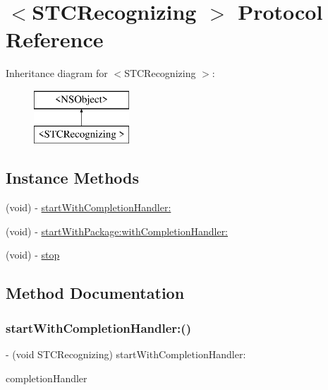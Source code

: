 \hypertarget{protocol_s_t_c_recognizing_01-p}{}\section{$<$S\+T\+C\+Recognizing $>$ Protocol Reference}
\label{protocol_s_t_c_recognizing_01-p}
Inheritance diagram for $<$S\+T\+C\+Recognizing $>$\+:\begin{figure}[H]
\begin{center}
\leavevmode
\includegraphics[height=2.000000cm]{protocol_s_t_c_recognizing_01-p}
\end{center}
\end{figure}
\subsection*{Instance Methods}
\begin{DoxyCompactItemize}
\item 
(void) -\/ \hyperlink{protocol_s_t_c_recognizing_01-p_ae0cec0327a48fd3fe5b712d13028d201}{start\+With\+Completion\+Handler\+:}
\item 
(void) -\/ \hyperlink{protocol_s_t_c_recognizing_01-p_af680d307ec5cb7c13486114a50149b3b}{start\+With\+Package\+:with\+Completion\+Handler\+:}
\item 
(void) -\/ \hyperlink{protocol_s_t_c_recognizing_01-p_a8654bee0d2c8cdea7df905605b7522f8}{stop}
\end{DoxyCompactItemize}


\subsection{Method Documentation}
\hypertarget{protocol_s_t_c_recognizing_01-p_ae0cec0327a48fd3fe5b712d13028d201}{}\label{protocol_s_t_c_recognizing_01-p_ae0cec0327a48fd3fe5b712d13028d201} 
\subsubsection{\texorpdfstring{start\+With\+Completion\+Handler\+:()}{startWithCompletionHandler:()}}
{\footnotesize\ttfamily -\/ (void S\+T\+C\+Recognizing) start\+With\+Completion\+Handler\+: \begin{DoxyParamCaption}\item[{(Recognizing\+Completion\+Handler)}]{completion\+Handler }\end{DoxyParamCaption}}

